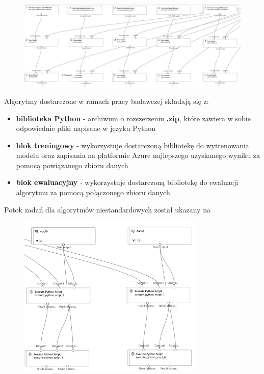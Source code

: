 \begin{figure}[H]
    \centering
    \includegraphics[width=\textwidth]{images/ms_pipe}
    \label{fig:ms-pipe}
\end{figure}

Algorytmy dostarczone w ramach pracy badawczej składają się z:
\begin{itemize}
    \item \textbf{biblioteka Python} - archiwum o rozszerzeniu \textbf{.zip}, które zawiera w sobie odpowiednie pliki napisane w języku Python
    \item \textbf{blok treningowy} - wykorzystuje dostarczoną bibliotekę do wytrenowania modelu oraz zapisania na platformie Azure najlepszego uzyskanego wyniku za pomocą powiązanego zbioru danych
    \item \textbf{blok ewaluacyjny} - wykorzystuje dostarczoną bibliotekę do ewaluacji algorytmu za pomocą połączonego zbioru danych
\end{itemize}

Potok zadań dla algorytmów niestandardowych został ukazany na 

\begin{figure}[H]
    \centering
    \includegraphics[width=0.8\textwidth]{images/au-pipe}
    \label{fig:au-pipe}
\end{figure}

